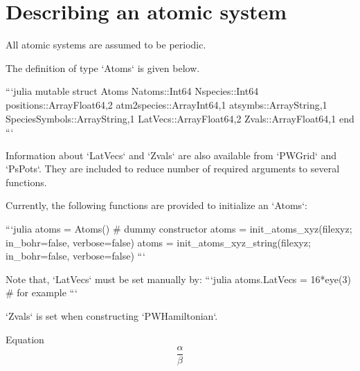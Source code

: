 \section{Describing an atomic system}

\begin{markdown}
All atomic systems are assumed to be periodic.

The definition of type `Atoms` is given below.

```julia
mutable struct Atoms
    Natoms::Int64
    Nspecies::Int64
    positions::Array{Float64,2}
    atm2species::Array{Int64,1}
    atsymbs::Array{String,1}
    SpeciesSymbols::Array{String,1}
    LatVecs::Array{Float64,2}
    Zvals::Array{Float64,1}
end
```

Information about `LatVecs` and `Zvals` are also available
from `PWGrid` and `PsPots`. They are included to reduce number of
required arguments to several functions.

Currently, the following functions are provided to initialize an `Atoms`:

```julia
atoms = Atoms() # dummy constructor
atoms = init_atoms_xyz(filexyz; in_bohr=false, verbose=false)
atoms = init_atoms_xyz_string(filexyz; in_bohr=false, verbose=false)
```

Note that, `LatVecs` must be set manually by:
```julia
atoms.LatVecs = 16*eye(3) # for example
```

`Zvals` is set when constructing `PWHamiltonian`.

Equation
\begin{equation}
\frac{\alpha}{\beta}
\end{equation}


\end{markdown}
